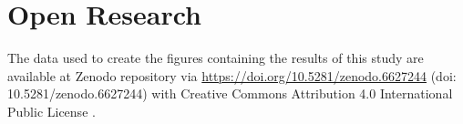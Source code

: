 \documentclass[draft]{agujournal2019}
\begin{document}


%
%
%
%

%
%

%

%


\section{Open Research}
The data used to create the figures containing the results of this study are available at Zenodo repository via \url{https://doi.org/10.5281/zenodo.6627244} (doi: 10.5281/zenodo.6627244) with Creative Commons Attribution 4.0 International Public License \cite{SoteloEdith2022}.
\end{document}
